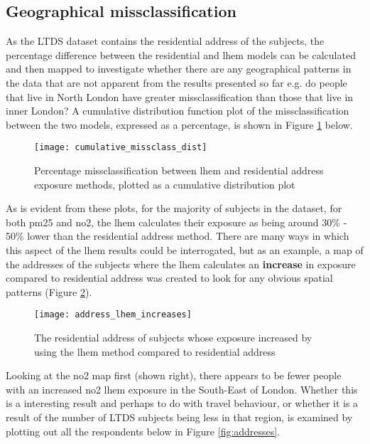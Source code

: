 \subsection{Geographical missclassification}
\label{subsec:geographical_missclassification}

As the LTDS dataset contains the residential address of the subjects, the percentage difference between the residential and \gls{lhem} models can be calculated and then mapped to investigate whether there are any geographical patterns in the data that are not apparent from the results presented so far e.g. do people that live in North London have greater missclassification than those that live in inner London? A cumulative distribution function plot of the missclassification between the two models, expressed as a percentage, is shown in Figure \ref{fig:cumulative_missclass_dist} below.

\begin{figure}[H]
\centering
\texttt{[image: cumulative\_missclass\_dist]}
\caption{Percentage missclassification between \gls{lhem} and residential address exposure methods, plotted as a cumulative distribution plot}
\label{fig:cumulative_missclass_dist}
\end{figure}

As is evident from these plots, for the majority of subjects in the dataset, for both \gls{pm25} and \gls{no2}, the \gls{lhem} calculates their exposure as being around 30\% - 50\% lower than the residential address method. There are many ways in which this aspect of the \gls{lhem} results could be interrogated, but as an example, a map of the addresses of the subjects where the \gls{lhem} calculates an \textbf{increase} in exposure compared to residential address was created to look for any obvious spatial patterns (Figure \ref{fig:address_lhem_increases}).

\begin{figure}[H]
\centering
\texttt{[image: address\_lhem\_increases]}
\caption{The residential address of subjects whose exposure increased by using the \gls{lhem} method compared to residential address}
\label{fig:address_lhem_increases}
\end{figure}

Looking at the \gls{no2} map first (shown right), there appears to be fewer people with an increased \gls{no2} \gls{lhem} exposure in the South-East of London. Whether this is a interesting result and perhaps to do with travel behaviour, or whether it is a result of the number of LTDS subjects being less in that region, is examined by plotting out all the respondents below in Figure \ref{fig:addresses}.

